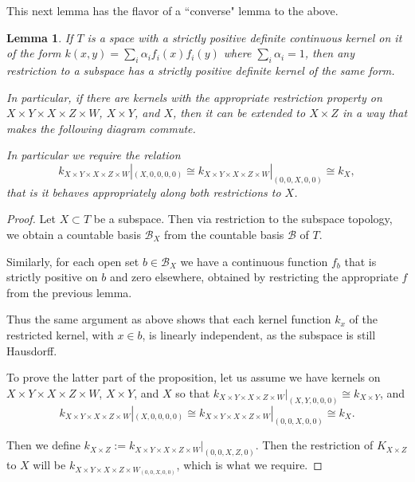 \documentclass[12pt]{amsart}
\newtheorem{lemma}[theorem]{Lemma}
\theoremstyle{definition}
\numberwithin{equation}{section}
\begin{document}
This next lemma has the flavor of a ``converse" lemma to the above.

\begin{lemma}
\label{restrictions}
    If $T$ is a space with a strictly positive definite continuous kernel on it of the form $k(x,y) = \sum_i\alpha_if_i(x)f_i(y)$ where $\sum_i\alpha_i = 1$, then any restriction to a subspace has a strictly positive definite kernel of the same form. 

    In particular, if there are kernels with the appropriate restriction property on $X\times Y\times X\times Z\times W$, $X\times Y$, and $X$, then it can be extended to $X\times Z$ in a way that makes the following diagram commute. 

    \begin{center}
    \end{center}
    In particular we require the relation \[k_{X\times Y\times X\times Z\times W}|_{(X, 0, 0,0, 0)} \cong k_{X\times Y\times X\times Z\times W}|_{(0, 0, X,0, 0)} \cong k_X,\] that is it behaves appropriately along both restrictions to $X$. 


\end{lemma}
\begin{proof}
    Let $X \subset T$ be a subspace. Then via restriction to the subspace topology, we obtain a countable basis $\mathcal B_X$ from the countable basis $\mathcal B$ of $T$. 

    Similarly, for each open set $b \in \mathcal B_X$ we have a continuous function $f_b$ that is strictly positive on $b$ and zero elsewhere, obtained by restricting the appropriate $f$ from the previous lemma. 

    Thus the same argument as above shows that each kernel function $k_x$ of the restricted kernel, with $x\in b$, is linearly independent, as the subspace is still Hausdorff. 

    To prove the latter part of the proposition, let us assume we have kernels on $X\times Y\times X\times Z\times W$, $X\times Y$, and $X$ so that $k_{X\times Y\times X\times Z\times W}|_{(X, Y, 0,0, 0)}\cong k_{X\times Y}$, and \[k_{X\times Y\times X\times Z\times W}|_{(X, 0, 0,0, 0)} \cong k_{X\times Y\times X\times Z\times W}|_{(0, 0, X,0, 0)} \cong k_X.\]

    Then we define $k_{X\times Z} := k_{X\times Y\times X\times Z\times W}|_{(0,0,X,Z,0)}.$ Then the restriction of $K_{X\times Z}$ to $X$ will be $k_{X\times Y\times X\times Z\times W_{(0,0, X, 0,0)}}$, which is what we require. 
\end{proof}
\end{document}
